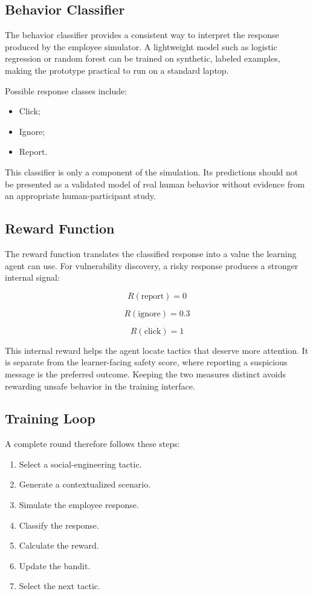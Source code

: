\documentclass[12pt,a4paper]{article}
\begin{document}
\subsection{Behavior Classifier}

The behavior classifier provides a consistent way to interpret the
response produced by the employee simulator. A lightweight model such
as logistic regression or random forest can be trained on synthetic,
labeled examples, making the prototype practical to run on a standard
laptop.

Possible response classes include:

\begin{itemize}
    \item Click;
    \item Ignore;
    \item Report.
\end{itemize}

This classifier is only a component of the simulation. Its predictions
should not be presented as a validated model of real human behavior
without evidence from an appropriate human-participant study.

\subsection{Reward Function}

The reward function translates the classified response into a value the
learning agent can use. For vulnerability discovery, a risky response
produces a stronger internal signal:

\[
R(\text{report}) = 0
\]

\[
R(\text{ignore}) = 0.3
\]

\[
R(\text{click}) = 1
\]

This internal reward helps the agent locate tactics that deserve more
attention. It is separate from the learner-facing safety score, where
reporting a suspicious message is the preferred outcome. Keeping the
two measures distinct avoids rewarding unsafe behavior in the training
interface.

\subsection{Training Loop}

A complete round therefore follows these steps:

\begin{enumerate}
    \item Select a social-engineering tactic.
    \item Generate a contextualized scenario.
    \item Simulate the employee response.
    \item Classify the response.
    \item Calculate the reward.
    \item Update the bandit.
    \item Select the next tactic.
\end{enumerate}
\end{document}
